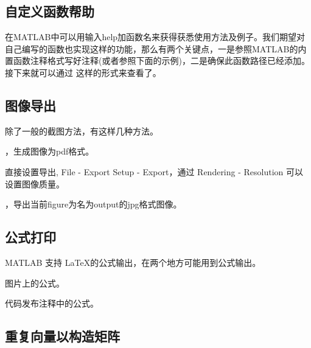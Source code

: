 \subsection{自定义函数帮助}

在MATLAB中可以用输入help加函数名来获得获悉使用方法及例子。我们期望对自己编写的函数也实现这样的功能，那么有两个关键点，一是参照MATLAB的内置函数注释格式写好注释(或者参照下面的示例)，二是确保此函数路径已经添加。接下来就可以通过  这样的形式来查看了。

\vspace{-0.8cm}






\subsection{图像导出}

除了一般的截图方法，有这样几种方法。

\begindot
  \item {}，生成图像为pdf格式。
  \item 直接设置导出, File - Export Setup - Export，通过 Rendering - Resolution 可以设置图像质量。
  \item {}，导出当前figure为名为output的jpg格式图像。
\myenddot





\subsection{公式打印}
MATLAB 支持 \LaTeX 的公式输出，在两个地方可能用到公式输出。

\begindot
  \item 图片上的公式。
  \item 代码发布注释中的公式。
\myenddot

\vspace{-0.8cm}






\subsection{重复向量以构造矩阵}

